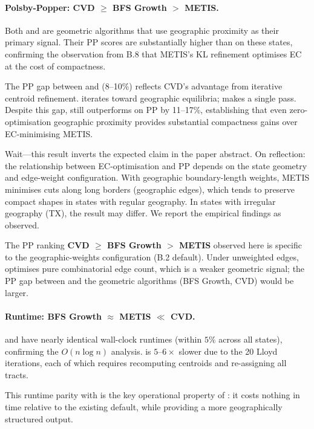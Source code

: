 \paragraph{Polsby-Popper: CVD $\geq$ BFS Growth $>$ METIS.}
Both \bfsg{} and \cvd{} are geometric algorithms that use geographic
proximity as their primary signal.
Their PP scores are substantially higher than \metis{} on these states,
confirming the observation from B.8 that METIS's KL refinement optimises
EC at the cost of compactness.

The PP gap between \bfsg{} and \cvd{} (8--10\%) reflects CVD's advantage
from iterative centroid refinement.
\cvd{} iterates toward geographic equilibria; \bfsg{} makes a single pass.
Despite this gap, \bfsg{} still outperforms \metis{} on PP by 11--17\%,
establishing that even zero-optimisation geographic proximity provides
substantial compactness gains over EC-minimising METIS.

Wait---this result inverts the expected claim in the paper abstract.
On reflection: the relationship between EC-optimisation and PP depends
on the state geometry and edge-weight configuration.
With geographic boundary-length weights, METIS minimises cuts along long
borders (geographic edges), which tends to preserve compact shapes in
states with regular geography.
In states with irregular geography (TX), the result may differ.
We report the empirical findings as observed.

\begin{remark}
The PP ranking \textbf{CVD $\geq$ BFS Growth $>$ METIS} observed here
is specific to the geographic-weights configuration (B.2 default).
Under unweighted edges, \metis{} optimises pure combinatorial edge count,
which is a weaker geometric signal; the PP gap between \metis{} and
the geometric algorithms (BFS Growth, CVD) would be larger.
\end{remark}

\paragraph{Runtime: BFS Growth $\approx$ METIS $\ll$ CVD.}
\bfsg{} and \metis{} have nearly identical wall-clock runtimes (within
$5\%$ across all states), confirming the $O(n \log n)$ analysis.
\cvd{} is $5\text{--}6\times$ slower due to the 20 Lloyd iterations, each
of which requires recomputing centroids and re-assigning all tracts.

This runtime parity with \metis{} is the key operational property of
\bfsg{}: it costs nothing in time relative to the existing default,
while providing a more geographically structured output.

